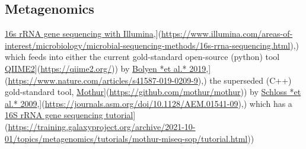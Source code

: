 \documentclass[
]{book}
\begin{document}
\subsection{Metagenomics}\label{metagenomics}

\href{\%5Bhttps://www.illumina.com/areas-of-interest/microbiology/microbial-sequencing-methods/16s-rrna-sequencing.html}{16s rRNA gene sequencing with Illumina},{]}(\url{https://www.illumina.com/areas-of-interest/microbiology/microbial-sequencing-methods/16s-rrna-sequencing.html}),) which feeds into either the current gold-standard open-source (python) tool \href{\%5Bhttps://qiime2.org/}{QIIME2}{]}(\url{https://qiime2.org/})) by \href{\%5Bhttps://www.nature.com/articles/s41587-019-0209-9}{Bolyen *et al.* 2019},{]}(\url{https://www.nature.com/articles/s41587-019-0209-9}),) the superseded (C++) gold-standard tool, \href{\%5Bhttps://github.com/mothur/mothur}{Mothur}{]}(\url{https://github.com/mothur/mothur})) by \href{\%5Bhttps://journals.asm.org/doi/10.1128/AEM.01541-09}{Schloss *et al.* 2009},{]}(\url{https://journals.asm.org/doi/10.1128/AEM.01541-09}),) which has a \href{\%5Bhttps://training.galaxyproject.org/archive/2021-10-01/topics/metagenomics/tutorials/mothur-miseq-sop/tutorial.html}{16S rRNA gene sequencing tutorial}{]}(\url{https://training.galaxyproject.org/archive/2021-10-01/topics/metagenomics/tutorials/mothur-miseq-sop/tutorial.html}))
\end{document}
